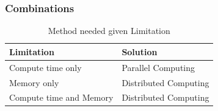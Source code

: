 \begin{frame}
		\frametitle{Combinations}

\begin{table}
\begin{tabular}{l l}
\toprule
\textbf{Limitation} & \textbf{Solution} \\
\midrule
Compute time only & Parallel Computing \\
Memory only & Distributed Computing \\
Compute time and Memory & Distributed Computing \\
\bottomrule
\end{tabular}
\caption{Method needed given Limitation}
\end{table}
\end{frame}
